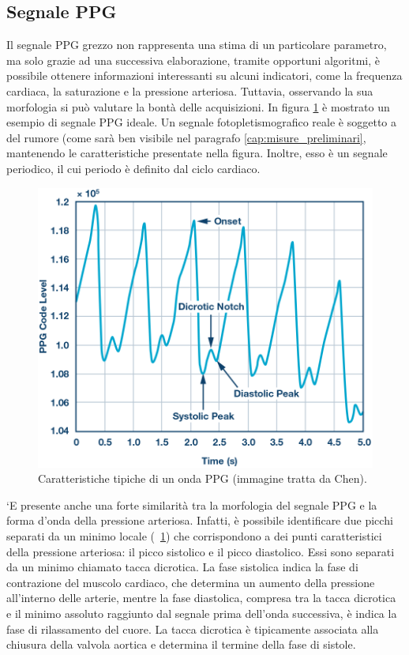 \subsection{Segnale PPG}
Il segnale PPG grezzo non rappresenta una stima di un particolare parametro, ma solo grazie ad una successiva elaborazione, tramite opportuni algoritmi, è possibile ottenere informazioni interessanti su alcuni indicatori, come la frequenza cardiaca, la saturazione e la pressione arteriosa.
Tuttavia, osservando la sua morfologia si può valutare la bontà delle acquisizioni\cite{Foroozan2018}. In figura \ref{fig:Descrizione_Segnale_PPG} è mostrato un esempio di segnale PPG ideale. Un segnale fotopletismografico reale è soggetto a del rumore (come sarà ben visibile nel paragrafo \ref{cap:misure_preliminari}, mantenendo le caratteristiche presentate nella figura. Inoltre, esso è un segnale periodico, il cui periodo è definito dal ciclo cardiaco.
\begin{figure}[t]
	\centering
	\includegraphics[width=0.7\linewidth]{ImageFiles/Misure Preliminari/descrizione_segnale_ppg}
	\caption{Caratteristiche tipiche di un onda PPG (immagine tratta da Chen\cite{Ppgsignal}).}
	\label{fig:Descrizione_Segnale_PPG}
\end{figure}
`E presente anche una forte similarità tra la morfologia del segnale PPG e la forma d'onda della pressione arteriosa. Infatti, è possibile identificare due picchi separati da un minimo locale (\Fig~\ref{fig:Descrizione_Segnale_PPG}) che corrispondono a dei punti caratteristici della pressione arteriosa: il picco sistolico e il picco diastolico. Essi sono separati da un minimo chiamato tacca dicrotica. La fase sistolica indica la fase di contrazione del muscolo cardiaco, che determina un aumento della pressione all'interno delle arterie, mentre la fase diastolica, compresa tra la tacca dicrotica e il minimo assoluto raggiunto dal segnale prima dell'onda successiva, è indica la fase di rilassamento del cuore\cite{Singh2017}. La tacca dicrotica è tipicamente associata alla chiusura della valvola aortica e determina il termine della fase di sistole\cite{Gamrah2020}.

